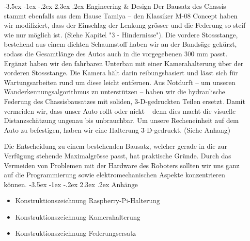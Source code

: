 \documentclass[a4paper]{scrarticle}
\makeatletter
\renewcommand\section{\@startsection {section}{1}{\z@}%
                                   {-3.5ex \@plus -1ex \@minus -.2ex}%
                                   {2.3ex \@plus.2ex}%
                                   {\Huge\AKAfont}}
\makeatother
\begin{document}
\section{Engineering \& Design}
Der Bausatz des Chassis stammt ebenfalls aus dem Hause Tamiya – den Klassiker M-08 Concept haben wir modifiziert, dass der Einschlag der Lenkung grösser und die Federung so steif wie nur möglich ist. (Siehe Kapitel "3 - Hindernisse").
Die vordere Stossstange, bestehend aus einem dichten Schaumstoff haben wir an der Bandsäge gekürzt, sodass die Gesamtlänge des Autos auch in die vorgegebenen 300 mm passt.
Ergänzt haben wir den fahrbaren Unterbau mit einer Kamerahalterung über der vorderen Stossstange. Die Kamera hält darin reibungsbasiert und lässt sich für Wartungsarbeiten rund um diese leicht entfernen.
Aus Notdurft – um unseren Wanderkennungsalgorithmus zu unterstützen – haben wir die hydraulische Federung des Chassisbausatzes mit soliden, 3-D-gedruckten Teilen ersetzt. Damit vermeiden wir, dass unser Auto rollt oder nickt – denn dies macht die visuelle Distanzschätzung ungenau bis unbrauchbar.
Um unsere Recheneinheit auf dem Auto zu befestigen, haben wir eine Halterung 3-D-gedruckt. (Siehe Anhang)

Die Entscheidung zu einem bestehenden Bausatz, welcher gerade in die zur Verfügung stehende Maximalgrösse passt, hat praktische Gründe. Durch das Vermeiden von Problemen mit der Hardware des Roboters sollten wir uns ganz auf die Programmierung sowie elektromechanischen Aspekte konzentrieren können.
\section{Anhänge}

\begin{itemize}
	\item Konstruktionszeichnung Raspberry-Pi-Halterung
	\item Konstruktionszeichnung Kamerahalterung
	\item Konstruktionszeichnung Federungsersatz
\end{itemize}





\end{document}
